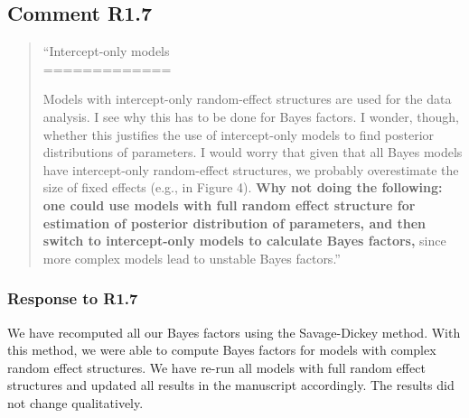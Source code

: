 \documentclass[12pt]{article}
\begin{document}
\setcounter{figure}{5}

\begin{quote}
\end{quote}

\newpage

\subsection*{Comment R1.7}
\begin{quote}
``Intercept-only models\\
=============

Models with intercept-only random-effect structures are used for the data analysis. I see why this has to be done for Bayes factors. I wonder, though, whether this justifies the use of intercept-only models to find posterior distributions of parameters. I would worry that given that all Bayes models have intercept-only random-effect structures, we probably overestimate the size of fixed effects (e.g., in Figure 4). \textbf{Why not doing the following: one could use models with full random effect structure for estimation of posterior distribution of parameters, and then switch to intercept-only models to calculate Bayes factors,} since more complex models lead to unstable Bayes factors.''\end{quote}


\subsubsection*{Response to R1.7}
We have recomputed all our Bayes factors using the Savage-Dickey method. With this method, we were able to compute Bayes factors for models with complex random effect structures. We have re-run all models with full random effect structures and updated all results in the manuscript accordingly. The results did not change qualitatively.
\end{document}
